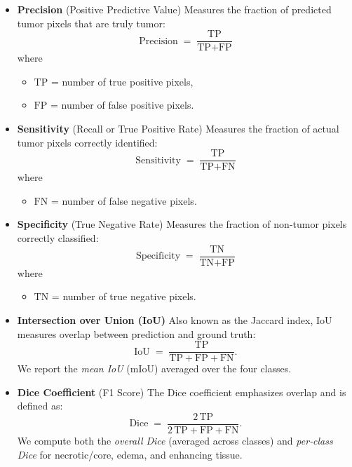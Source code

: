 \begin{itemize}
  \item \textbf{Precision} (Positive Predictive Value)
        Measures the fraction of predicted tumor pixels that are truly tumor:
        \[
          \text{Precision} \;=\; \frac{\text{TP}}{\text{TP} + \text{FP}}
        \]
        where
        \begin{itemize}
          \item \(\text{TP}\) = number of true positive pixels,
          \item \(\text{FP}\) = number of false positive pixels.
        \end{itemize}

  \item \textbf{Sensitivity} (Recall or True Positive Rate)
        Measures the fraction of actual tumor pixels correctly identified:
        \[
          \text{Sensitivity} \;=\; \frac{\text{TP}}{\text{TP} + \text{FN}}
        \]
        where
        \begin{itemize}
          \item \(\text{FN}\) = number of false negative pixels.
        \end{itemize}

  \item \textbf{Specificity} (True Negative Rate)
        Measures the fraction of non‐tumor pixels correctly classified:
        \[
          \text{Specificity} \;=\; \frac{\text{TN}}{\text{TN} + \text{FP}}
        \]
        where
        \begin{itemize}
          \item \(\text{TN}\) = number of true negative pixels.
        \end{itemize}
  \item \textbf{Intersection over Union (IoU)}
        Also known as the Jaccard index, IoU measures overlap between prediction and ground truth:
        \[
          \text{IoU} \;=\; \frac{\text{TP}}{\text{TP} + \text{FP} + \text{FN}}.
        \]
        We report the \emph{mean IoU} (mIoU) averaged over the four classes.

  \item \textbf{Dice Coefficient} (F1 Score)
        The Dice coefficient emphasizes overlap and is defined as:
        \[
          \text{Dice} \;=\; \frac{2\,\text{TP}}{2\,\text{TP} + \text{FP} + \text{FN}}.
        \]
        We compute both the \emph{overall Dice} (averaged across classes) and \emph{per‐class Dice} for necrotic/core, edema, and enhancing tissue.
\end{itemize}

